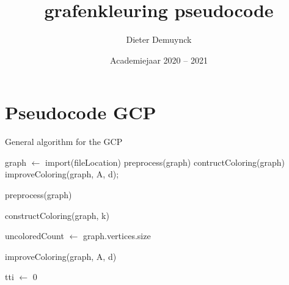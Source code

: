 \documentclass[a4paper,kulak]{kulakarticle} %
\date{Academiejaar 2020 -- 2021}
\title{grafenkleuring pseudocode}
\author{Dieter Demuynck}
\begin{document}
\maketitle

\section*{Pseudocode GCP}

\begin{algorithm}
	\caption{General algorithm for the GCP}\label{alg:GCP}
	graph $\gets$ import(fileLocation)\;
	preprocess(graph)\;
	contructColoring(graph)\;
	improveColoring(graph, A, d);
\end{algorithm}

\begin{function}
	\caption{preprocess(graph)}\label{func:preprocess}
	
\end{function}

\begin{function}
	\caption{constructColoring(graph, k)}\label{func:color_contruction}
	
	uncoloredCount $\gets$ graph.vertices.size\;
\end{function}

\begin{function}
	\caption{improveColoring(graph, A, d)}\label{func:color_improvement}
	
	tti $\gets$ 0
	
\end{function}
\end{document}

